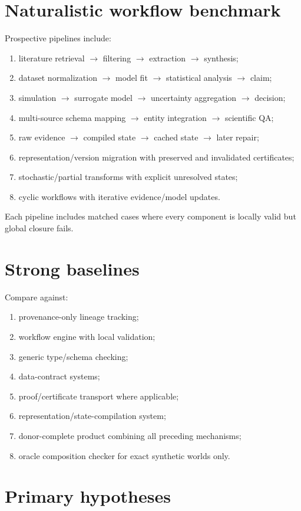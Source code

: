\documentclass[11pt]{article}
\begin{document}
\section{Naturalistic workflow benchmark}
Prospective pipelines include:
\begin{enumerate}
    \item literature retrieval $\to$ filtering $\to$ extraction $\to$ synthesis;
    \item dataset normalization $\to$ model fit $\to$ statistical analysis $\to$ claim;
    \item simulation $\to$ surrogate model $\to$ uncertainty aggregation $\to$ decision;
    \item multi-source schema mapping $\to$ entity integration $\to$ scientific QA;
    \item raw evidence $\to$ compiled state $\to$ cached state $\to$ later repair;
    \item representation/version migration with preserved and invalidated certificates;
    \item stochastic/partial transforms with explicit unresolved states;
    \item cyclic workflows with iterative evidence/model updates.
\end{enumerate}
Each pipeline includes matched cases where every component is locally valid but global closure fails.

\section{Strong baselines}
Compare against:
\begin{enumerate}
    \item provenance-only lineage tracking;
    \item workflow engine with local validation;
    \item generic type/schema checking;
    \item data-contract systems;
    \item proof/certificate transport where applicable;
    \item representation/state-compilation system;
    \item donor-complete product combining all preceding mechanisms;
    \item oracle composition checker for exact synthetic worlds only.
\end{enumerate}

\section{Primary hypotheses}
\end{document}
